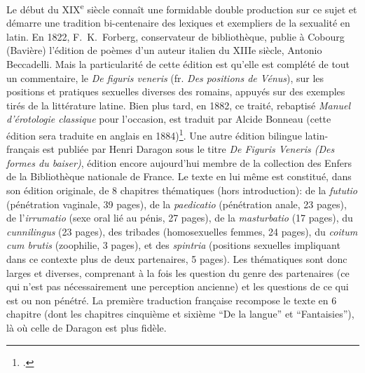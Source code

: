 Le début du XIX\textsuperscript{e} siècle connaît une formidable double production sur ce sujet et démarre une tradition bi-centenaire des lexiques et exempliers de la sexualité en latin. En 1822, F.~K.~Forberg, conservateur de bibliothèque, publie à Cobourg (Bavière) l'édition de poèmes d'un auteur italien du XIIIe siècle, Antonio Beccadelli. Mais la particularité de cette édition est qu'elle est complété de tout un commentaire, le \textit{De figuris veneris} (fr. \textit{Des positions de Vénus}), sur les positions et pratiques sexuelles diverses des romains, appuyés sur des exemples tirés de la littérature latine. Bien plus tard, en 1882, ce traité, rebaptisé \textit{Manuel d'érotologie classique} pour l'occasion, est traduit par Alcide Bonneau (cette édition sera traduite en anglais en 1884)\footcite{parra1997figuris}. Une autre édition bilingue latin-français est publiée par Henri Daragon sous le titre \textit{De Figuris Veneris (Des formes du baiser)}, édition encore aujourd'hui membre de la collection des Enfers de la Bibliothèque nationale de France. Le texte en lui même est constitué, dans son édition originale, de 8 chapitres thématiques (hors introduction): de la \textit{fututio} (pénétration vaginale, 39 pages), de la \textit{paedicatio} (pénétration anale, 23 pages), de l'\textit{irrumatio} (sexe oral lié au pénis, 27 pages), de la \textit{masturbatio} (17 pages), du \textit{cunnilingus} (23 pages), des tribades (homosexuelles femmes, 24 pages), du \textit{coitum cum brutis} (zoophilie, 3 pages), et des \textit{spintria} (positions sexuelles impliquant dans ce contexte plus de deux partenaires, 5 pages). Les thématiques sont donc larges et diverses, comprenant à la fois les question du genre des partenaires (ce qui n'est pas nécessairement une perception ancienne) et les questions de ce qui est ou non pénétré. La première traduction française recompose le texte en 6 chapitre (dont les chapitres cinquième et sixième \enquote{De la langue} et \enquote{Fantaisies}), là où celle de Daragon est plus fidèle.

